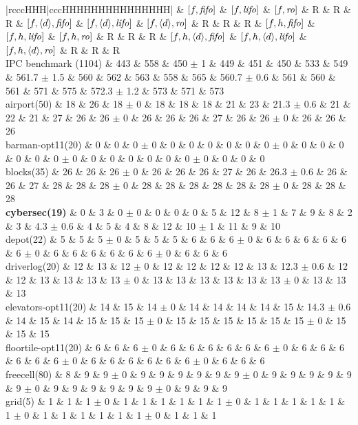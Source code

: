 \begin{center}
\begin{tabular}{|rcccHHH|cccHHHHHHHHHHHHHHH|}
\hline
 & $[f,{\text{\textit{fifo}}}]$ & $[f,{\text{\textit{lifo}}}]$ & $[f,{\text{\textit{ro}}}]$ & R & R & R & $[f,{\left<d\right>},{\text{\textit{fifo}}}]$ & $[f,{\left<d\right>},{\text{\textit{lifo}}}]$ & $[f,{\left<d\right>},{\text{\textit{ro}}}]$ & R & R & R & $[f,h,{\text{\textit{fifo}}}]$ & $[f,h,{\text{\textit{lifo}}}]$ & $[f,h,{\text{\textit{ro}}}]$ & R & R & R & $[f,h,{\left<d\right>},{\text{\textit{fifo}}}]$ & $[f,h,{\left<d\right>},{\text{\textit{lifo}}}]$ & $[f,h,{\left<d\right>},{\text{\textit{ro}}}]$ & R & R & R\\
\hline
IPC benchmark (1104) & 443 & 558 & 450 $\pm$ 1 & 449 & 451 & 450 & 533 & 549 & 561.7 $\pm$ 1.5 & 560 & 562 & 563 & 558 & 565 & 560.7 $\pm$ 0.6 & 561 & 560 & 561 & 571 & 575 & 572.3 $\pm$ 1.2 & 573 & 571 & 573\\
\hline
airport(50) & 18 & 26 & 18 $\pm$ 0 & 18 & 18 & 18 & 21 & 23 & 21.3 $\pm$ 0.6 & 21 & 22 & 21 & 27 & 26 & 26 $\pm$ 0 & 26 & 26 & 26 & 27 & 26 & 26 $\pm$ 0 & 26 & 26 & 26\\
barman-opt11(20) & 0 & 0 & 0 $\pm$ 0 & 0 & 0 & 0 & 0 & 0 & 0 $\pm$ 0 & 0 & 0 & 0 & 0 & 0 & 0 $\pm$ 0 & 0 & 0 & 0 & 0 & 0 & 0 $\pm$ 0 & 0 & 0 & 0\\
blocks(35) & 26 & 26 & 26 $\pm$ 0 & 26 & 26 & 26 & 27 & 26 & 26.3 $\pm$ 0.6 & 26 & 26 & 27 & 28 & 28 & 28 $\pm$ 0 & 28 & 28 & 28 & 28 & 28 & 28 $\pm$ 0 & 28 & 28 & 28\\
\textbf{cybersec(19)} & 0 & 3 & 0 $\pm$ 0 & 0 & 0 & 0 & 5 & 12 & 8 $\pm$ 1 & 7 & 9 & 8 & 2 & 3 & 4.3 $\pm$ 0.6 & 4 & 5 & 4 & 8 & 12 & 10 $\pm$ 1 & 11 & 9 & 10\\
depot(22) & 5 & 5 & 5 $\pm$ 0 & 5 & 5 & 5 & 6 & 6 & 6 $\pm$ 0 & 6 & 6 & 6 & 6 & 6 & 6 $\pm$ 0 & 6 & 6 & 6 & 6 & 6 & 6 $\pm$ 0 & 6 & 6 & 6\\
driverlog(20) & 12 & 13 & 12 $\pm$ 0 & 12 & 12 & 12 & 12 & 13 & 12.3 $\pm$ 0.6 & 12 & 12 & 13 & 13 & 13 & 13 $\pm$ 0 & 13 & 13 & 13 & 13 & 13 & 13 $\pm$ 0 & 13 & 13 & 13\\
elevators-opt11(20) & 14 & 15 & 14 $\pm$ 0 & 14 & 14 & 14 & 14 & 15 & 14.3 $\pm$ 0.6 & 14 & 15 & 14 & 15 & 15 & 15 $\pm$ 0 & 15 & 15 & 15 & 15 & 15 & 15 $\pm$ 0 & 15 & 15 & 15\\
floortile-opt11(20) & 6 & 6 & 6 $\pm$ 0 & 6 & 6 & 6 & 6 & 6 & 6 $\pm$ 0 & 6 & 6 & 6 & 6 & 6 & 6 $\pm$ 0 & 6 & 6 & 6 & 6 & 6 & 6 $\pm$ 0 & 6 & 6 & 6\\
freecell(80) & 8 & 9 & 9 $\pm$ 0 & 9 & 9 & 9 & 9 & 9 & 9 $\pm$ 0 & 9 & 9 & 9 & 9 & 9 & 9 $\pm$ 0 & 9 & 9 & 9 & 9 & 9 & 9 $\pm$ 0 & 9 & 9 & 9\\
grid(5) & 1 & 1 & 1 $\pm$ 0 & 1 & 1 & 1 & 1 & 1 & 1 $\pm$ 0 & 1 & 1 & 1 & 1 & 1 & 1 $\pm$ 0 & 1 & 1 & 1 & 1 & 1 & 1 $\pm$ 0 & 1 & 1 & 1\\

\end{tabular}
\end{center}
